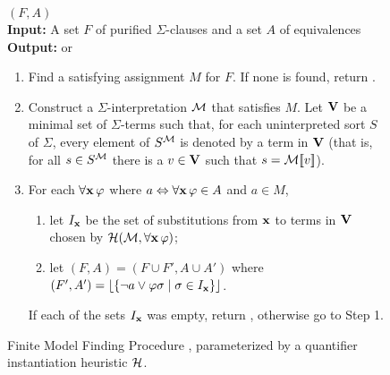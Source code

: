 \documentclass{svjour3}                     %
\begin{document}
\begin{figure}
\begin{framed}
\fmsolve$( F, A )$ \\[1ex]
{\bf Input:} A set $F$ of purified $\Sigma$-clauses and a set $A$ of equivalences \\
{\bf Output:} \sat or \unsat
\smallskip

\begin{enumerate}
\item 
Find a satisfying assignment $M$ for $F$.  
If none is found, return \unsat.
\smallskip

\item 
Construct a $\Sigma$-interpretation $\mathcal{M}$ that satisfies $M$.
Let $\mathbf{V}$ be a minimal set of $\Sigma$-terms such that,
for each uninterpreted sort $S$ of $\Sigma$,
every element of $S^{\mathcal{M}}$ is denoted by a term in $\mathbf{V}$
(that is, for all $s \in S^{\mathcal{M}}$ there is a $v \in \mathbf{V}$ 
such that $s = \mathcal{M} [ \negthinspace [ v ] \negthinspace ]$).
\smallskip

\item 
For each $\forall \mathbf{x}\,\varphi$ where $a \Leftrightarrow \forall \mathbf{x}\, \varphi \in A$ and $a \in M$,
\smallskip

\begin{enumerate}
\item
let $I_{\mathbf{x}}$ be the set of substitutions from $\mathbf{x}$ to terms in $\mathbf{V}$ chosen by $\mathcal{H}( \mathcal{M}, \forall \mathbf{x}\,\varphi )$;
\smallskip

\item
let $(F, A ) = (F \cup F', A \cup A')$
where 
$( F', A' ) = \lfloor  \{ \neg a \vee \varphi \sigma \mid \sigma \in I_{\mathbf{x}} \} \rfloor$.
\end{enumerate}
\smallskip

If each of the sets $I_{\mathbf{x}}$ was empty, return \sat, 
otherwise go to Step 1.

\end{enumerate}
\end{framed}
\caption{Finite Model Finding Procedure \fmsolve, parameterized by a quantifier instantiation heuristic $\mathcal{H}$. }
\label{fig:fmf-proc}
\end{figure}
\end{document}
